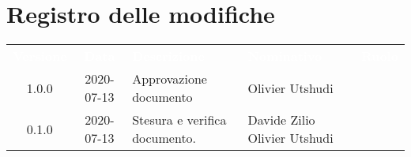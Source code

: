 \section*{Registro delle modifiche}
{
	\centering
	\begin{longtable}{ c c C{4cm}  C{4cm}  C{3cm} }
		\textcolor{white}{\textbf{Versione}} & \textcolor{white}{\textbf{Data}} & \textcolor{white}{\textbf{Descrizione}} & \textcolor{white}{\textbf{Nominativo}} & \textcolor{white}{\textbf{Ruolo}}\\		
		1.0.0 & 2020-07-13 & Approvazione documento & Olivier Utshudi &\RdP{}\\		
		0.1.0 & 2020-07-13 & Stesura e verifica documento. & Davide Zilio \newline Olivier Utshudi &\reda{} \newline \ver{} \\		
		
	\end{longtable}

}